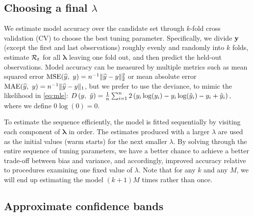 \subsection{Choosing a final $\lambda$}
\label{sec:cv}

We estimate model accuracy over the candidate set through $k$-fold cross
validation (CV) to choose the best tuning parameter. Specifically, we divide
$\mathbf{y}$ (except the first and last observations) roughly evenly and randomly into
$k$ folds, estimate $\mathcal{R}_t$ for all $\boldsymbol{\lambda}$ leaving one fold
out, and then predict the held-out observations. Model accuracy can be measured
by multiple metrics such as mean squared error $\mathrm{MSE}(\widehat{y},\ y) =
n^{-1}\lVert \widehat{y} - y \rVert_2^2$ or mean absolute error
$\mathrm{MAE}(\widehat{y},\ y) = n^{-1}\lVert \widehat{y} - y \rVert_1$, but we prefer
to use the deviance, to mimic the likelihood in \autoref{eq:mle}: $D\left(y,\
\hat{y}\right) = \frac{1}{n} \sum_{i=1}^n 2\left(y_i \log(y_i) - y_i\log(\hat{y}_i) - y_i +
\hat{y}_i\right),$ where we define $0\log(0) = 0$. 

To estimate the sequence efficiently, the model is fitted sequentially by visiting each component 
of $\boldsymbol{\lambda}$ in order. The estimates produced with a larger 
$\lambda$ are used as the initial values (warm starts) for the next smaller $\lambda$. 
By solving through the entire sequence of tuning parameters, we have a better chance to 
achieve a better trade-off between bias and variance, and accordingly, improved
accuracy relative to procedures examining one fixed value of $\lambda$. Note
that for any $k$ and any $M$, we will end up estimating the model $(k+1)M$
times rather than once.


\subsection{Approximate confidence bands} 
\label{sec:conf-band} 

